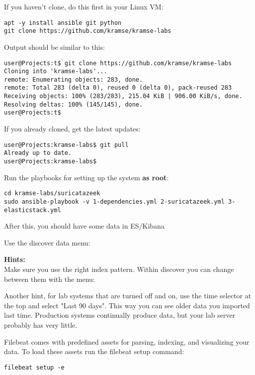 \documentclass[a4paper,11pt,notitlepage]{report}
\begin{document}
If you haven't clone, do this first in your Linux VM:
\begin{verbatim}
apt -y install ansible git python
git clone https://github.com/kramse/kramse-labs
\end{verbatim}

Output should be similar to this:
\begin{verbatim}
user@Projects:t$ git clone https://github.com/kramse/kramse-labs
Cloning into 'kramse-labs'...
remote: Enumerating objects: 283, done.
remote: Total 283 (delta 0), reused 0 (delta 0), pack-reused 283
Receiving objects: 100% (283/283), 215.04 KiB | 906.00 KiB/s, done.
Resolving deltas: 100% (145/145), done.
user@Projects:t$
\end{verbatim}

If you already cloned, get the latest updates:
\begin{verbatim}
user@Projects:kramse-labs$ git pull
Already up to date.
user@Projects:kramse-labs$
\end{verbatim}

Run the playbooks for setting up the system {\bf as root}:
\begin{verbatim}
cd kramse-labs/suricatazeek
sudo ansible-playbook -v 1-dependencies.yml 2-suricatazeek.yml 3-elasticstack.yml
\end{verbatim}

After this, you should have some data in ES/Kibana

Use the discover data menu:


{\bf Hints:}\\
Make sure you use the right index pattern. Within discover you can change between them with the menu:


Another hint, for lab systems that are turned off and on, use the time selector at the top and select "Last 90 days". This way you can see older data you imported last time. Production systems continually produce data, but your lab server probably has very little.


Filebeat comes with predefined assets for parsing, indexing, and visualizing your data. To load these assets run the filebeat setup command:

\begin{verbatim}
filebeat setup -e
\end{verbatim}
\end{document}
